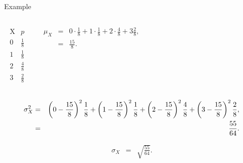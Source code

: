 \begin{frame}{Example}
  \begin{columns}
    \begin{eqnarray*}
      \begin{array}{r|l}
        \mathrm{X} & p \\ \hline
         0 & \frac{1}{8} \\ [5pt]
         1 & \frac{1}{8} \\ [5pt]
         2 & \frac{4}{8} \\ [5pt]
         3 & \frac{2}{8}
      \end{array}
    \end{eqnarray*}

    {
      \begin{eqnarray*}
        \mu_X & = & 0 \cdot \frac{1}{8} + 1 \cdot \frac{1}{8} + 2 \cdot \frac{4}{8} + 3 \frac{2}{8}, \\
        & = & \frac{15}{8}.
      \end{eqnarray*}
    }

  \end{columns}

    {
        \begin{eqnarray*}
          \sigma^2_X & = & \left( 0-\frac{15}{8}\right)^2 \frac{1}{8} + 
          \left( 1-\frac{15}{8}\right)^2 \frac{1}{8} + \left( 2-\frac{15}{8}\right)^2 \frac{4}{8} + 
          \left( 3-\frac{15}{8}\right)^2 \frac{2}{8}, \\
          & = & \frac{55}{64}.
        \end{eqnarray*}
    }

    {
      \begin{eqnarray*}
        \sigma_X & = & \sqrt{\frac{55}{64}}.
      \end{eqnarray*}
      \vfill
    }

    

\end{frame}



